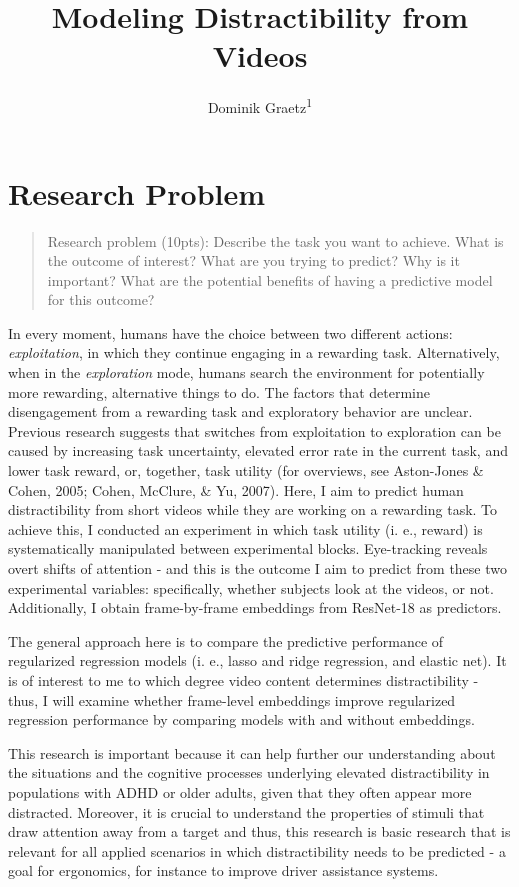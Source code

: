 \documentclass[
  man]{apa6}
\title{Modeling Distractibility from Videos}
\author{Dominik Graetz\textsuperscript{1}}
\date{}
\affiliation{\vspace{0.5cm}\textsuperscript{1} University of Oregon}
\begin{document}
\maketitle

\hypertarget{research-problem}{%
\section{Research Problem}\label{research-problem}}

\begin{quote}
Research problem (10pts): Describe the task you want to achieve. What is the outcome of interest? What are you trying to predict? Why is it important? What are the potential benefits of having a predictive model for this outcome?
\end{quote}

In every moment, humans have the choice between two different actions: \emph{exploitation}, in which they continue engaging in a rewarding task. Alternatively, when in the \emph{exploration} mode, humans search the environment for potentially more rewarding, alternative things to do. The factors that determine disengagement from a rewarding task and exploratory behavior are unclear. Previous research suggests that switches from exploitation to exploration can be caused by increasing task uncertainty, elevated error rate in the current task, and lower task reward, or, together, task utility (for overviews, see Aston-Jones \& Cohen, 2005; Cohen, McClure, \& Yu, 2007). Here, I aim to predict human distractibility from short videos while they are working on a rewarding task. To achieve this, I conducted an experiment in which task utility (i. e., reward) is systematically manipulated between experimental blocks. Eye-tracking reveals overt shifts of attention - and this is the outcome I aim to predict from these two experimental variables: specifically, whether subjects look at the videos, or not. Additionally, I obtain frame-by-frame embeddings from ResNet-18 as predictors.

The general approach here is to compare the predictive performance of regularized regression models (i. e., lasso and ridge regression, and elastic net). It is of interest to me to which degree video content determines distractibility - thus, I will examine whether frame-level embeddings improve regularized regression performance by comparing models with and without embeddings.

This research is important because it can help further our understanding about the situations and the cognitive processes underlying elevated distractibility in populations with ADHD or older adults, given that they often appear more distracted. Moreover, it is crucial to understand the properties of stimuli that draw attention away from a target and thus, this research is basic research that is relevant for all applied scenarios in which distractibility needs to be predicted - a goal for ergonomics, for instance to improve driver assistance systems.
\end{document}
